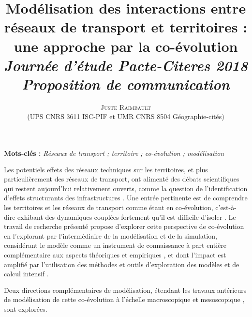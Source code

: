 \documentclass[11pt]{article}
\newcommand{\noun}[1]{\textsc{#1}}
\begin{document}
\title{\vspace{-2cm}
Modélisation des interactions entre réseaux de transport et territoires : une approche par la co-évolution
\medskip\\
\textit{Journée d'étude Pacte-Citeres 2018\\
Proposition de communication
}
}
\author{\noun{Juste Raimbault}\medskip\\
(UPS CNRS 3611 ISC-PIF et UMR CNRS 8504 Géographie-cités)\\
}
\date{}

\maketitle

\justify



\textbf{Mots-clés : }\textit{Réseaux de transport ; territoire ; co-évolution ; modélisation}

\medskip




Les potentiels effets des réseaux techniques sur les territoires, et plus particulièrement des réseaux de transport, ont alimenté des débats scientifiques qui restent aujourd'hui relativement ouverts, comme la question de l'identification d'effets structurants des infrastructures \citep{offner1993effets,espacegeo2014effets}. Une entrée pertinente est de comprendre les territoires et les réseaux de transport comme étant en co-évolution, c'est-à-dire exhibant des dynamiques couplées fortement qu'il est difficile d'isoler \citep{bretagnolle:tel-00459720}. Le travail de recherche présenté propose d'explorer cette perspective de co-évolution en l'explorant par l'intermédiaire de la modélisation et de la simulation, considérant le modèle comme un instrument de connaissance à part entière \citep{banos2013pour} complémentaire aux aspects théoriques et empiriques \citep{raimbault2017applied}, et dont l'impact est amplifié par l'utilisation des méthodes et outils d'exploration des modèles et de calcul intensif \citep{pumain2017urban}.


Deux directions complémentaires de modélisation, étendant les travaux antérieurs de modélisation de cette co-évolution à l'échelle macroscopique \citep{baptistemodeling,schmitt2014modelisation} et mesoscopique \citep{raimbault2014hybrid}, sont explorées.
\end{document}
